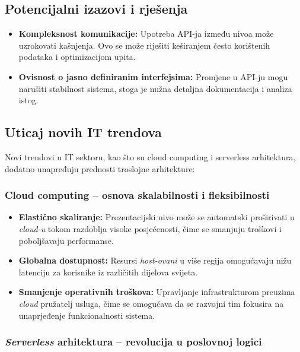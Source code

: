 \subsection{Potencijalni izazovi i rješenja}
\begin{itemize}[label=\textbullet]
    \item \textbf{Kompleksnost komunikacije:} Upotreba API-ja između nivoa može uzrokovati kašnjenja. Ovo se može riješiti keširanjem često korištenih podataka i optimizacijom upita.
    \item \textbf{Ovisnost o jasno definiranim interfejsima:} Promjene u API-ju mogu narušiti stabilnost sistema, stoga je nužna detaljna dokumentacija i analiza istog.
\end{itemize}

\subsection{Uticaj novih IT trendova}

Novi trendovi u IT sektoru, kao što su cloud computing i serverless arhitektura, dodatno unapređuju prednosti troslojne arhitekture:

\subsubsection{Cloud computing – osnova skalabilnosti i fleksibilnosti}

\begin{itemize}[label=\textbullet]
    \item \textbf{Elastično skaliranje:} Prezentacijski nivo može se automatski proširivati u \textit{cloud-u} tokom razdoblja visoke posjećenosti, čime se smanjuju troškovi i poboljšavaju performanse.
    \item \textbf{Globalna dostupnost:} Resursi \textit{host-ovani} u više regija omogućavaju nižu latenciju za korisnike iz različitih dijelova svijeta.
    \item \textbf{Smanjenje operativnih troškova:} Upravljanje infrastrukturom preuzima \textit{cloud} pružatelj usluga, čime se omogućava da se razvojni tim fokusira na unaprjeđenje funkcionalnosti sistema.
\end{itemize}

\subsubsection{\textit{Serverless} arhitektura – revolucija u poslovnoj logici}

